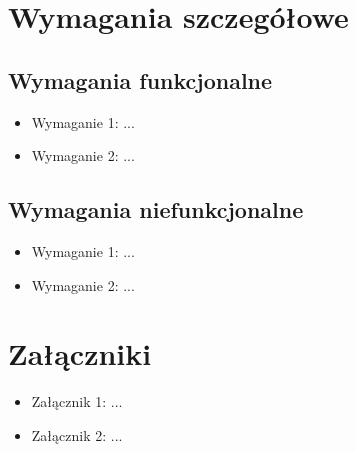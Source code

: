 \documentclass[a4paper,12pt]{article}
\begin{document}
\section{Wymagania szczegółowe}
\subsection{Wymagania funkcjonalne}
\begin{itemize}
    \item Wymaganie 1: ...
    \item Wymaganie 2: ...
\end{itemize}

\subsection{Wymagania niefunkcjonalne}
\begin{itemize}
    \item Wymaganie 1: ...
    \item Wymaganie 2: ...
\end{itemize}

\section{Załączniki}
\begin{itemize}
    \item Załącznik 1: ...
    \item Załącznik 2: ...
\end{itemize}
\end{document}
